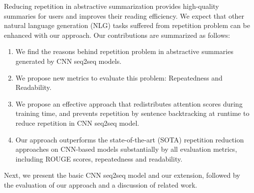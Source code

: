 %



Reducing repetition in abstractive summarization provides high-quality summaries for users and improves their reading efficiency.
We expect that other natural language generation (NLG) tasks suffered from repetition problem can be enhanced with our approach. 
Our contributions are summarized as follows:
\begin{enumerate}
\item We find the reasons behind repetition problem in abstractive summaries generated
by CNN seq2seq models.
\item We propose new metrics to evaluate this problem: Repeatedness and Readability.
\item We propose an effective approach that redistributes attention scores 
during training time, and prevents repetition by sentence backtracking
at runtime to reduce repetition in CNN seq2seq model.
\item Our approach
outperforms the state-of-the-art (SOTA) repetition reduction approaches on CNN-based models
substantially by all evaluation metrics, including ROUGE scores, 
repeatedness and readability.
\end{enumerate}

Next, we present the basic CNN seq2seq model and our extension, 
followed by the evaluation of our approach and a discussion of related work.
